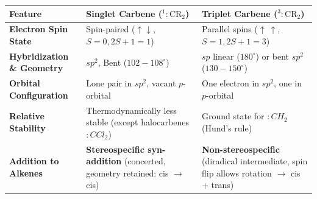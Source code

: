 \documentclass[10pt,twoside,openright]{book}
\begin{document}
\begin{formulabox}
{\setlength{\tabcolsep}{3.5pt}%
\begin{tabularx}{\linewidth}{|l|Y|Y|}
\hline
\textbf{Feature} & \textbf{Singlet Carbene ($^1:\mathrm{CR_2}$)} & \textbf{Triplet Carbene ($^3:\mathrm{CR_2}$)} \\
\hline
\textbf{Electron Spin State} & Spin-paired ($\uparrow\downarrow$, $S=0, 2S+1=1$) & Parallel spins ($\uparrow\ \uparrow$, $S=1, 2S+1=3$) \\
\hline
\textbf{Hybridization \& Geometry} & $sp^2$, Bent ($102-108^\circ$) & $sp$ linear ($180^\circ$) or bent $sp^2$ ($130-150^\circ$) \\
\hline
\textbf{Orbital Configuration} & Lone pair in $sp^2$, vacant $p$-orbital & One electron in $sp^2$, one in $p$-orbital \\
\hline
\textbf{Relative Stability} & Thermodynamically less stable (except halocarbenes $:CCl_2$) & Ground state for $:CH_2$ (Hund's rule) \\
\hline
\textbf{Addition to Alkenes} & \textbf{Stereospecific syn-addition} (concerted, geometry retained: cis $\to$ cis) & \textbf{Non-stereospecific} (diradical intermediate, spin flip allows rotation $\to$ cis + trans) \\
\hline
\end{tabularx}}
\end{formulabox}
\end{document}
